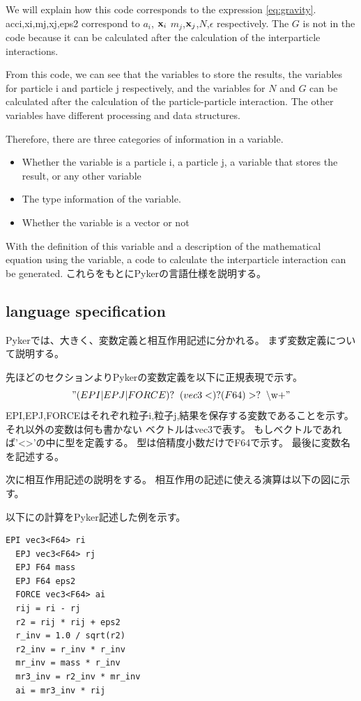 \documentclass[ams, a4j]{U-AizuGT}
\begin{document}
We will explain how this code corresponds to the expression 
\eqref{eq:gravity}.
acci,xi,mj,xj,eps2 correspond to
 $a_i$, $\vb{x}_i$ $m_j$,$\vb{x}_j$,$N$,$\epsilon$ respectively.
The $G$ is not in the code because it can be calculated after the 
calculation of the interparticle interactions.


 From this code, we can see that the variables to store the results, 
the variables for particle i and particle j respectively, and the 
variables for $N$ and $G$ can be calculated after the calculation of 
the particle-particle interaction. The other variables have different 
processing and data structures.


 Therefore, there are three categories of information in a variable.
\begin{itemize}
  \item Whether the variable is a particle i, a particle j, a
  variable that stores the result, or any other variable
  \item The type information of the variable.
  \item Whether the variable is a vector or not
\end{itemize}

 With the definition of this variable and a description of the
mathematical equation using the variable, a code to calculate the
interparticle interaction can be generated.
これらをもとにPykerの言語仕様を説明する。

\subsection{language specification}
Pykerでは、大きく、変数定義と相互作用記述に分かれる。
まず変数定義について説明する。


 先ほどのセクションよりPykerの変数定義を以下に正規表現で示す。
\["(EPI|EPJ|FORCE)?\:\text{ } (vec3<)?(F64)>?\:\text{ } \text{\textbackslash w+}"\]
EPI,EPJ,FORCEはそれぞれ粒子i,粒子j,結果を保存する変数であることを示す。それ以外の変数は何も書かない
ベクトルはvec3で表す。
もしベクトルであれば'<>'の中に型を定義する。
型は倍精度小数だけでF64で示す。
最後に変数名を記述する。


次に相互作用記述の説明をする。
相互作用の記述に使える演算は以下の図に示す。

以下に\label{eq:gravity}の計算をPyker記述した例を示す。
\begin{lstlisting}[frame=single, caption=gravity\_interparticle, label=fuga]
  EPI vec3<F64> ri
  EPJ vec3<F64> rj
  EPJ F64 mass
  EPJ F64 eps2
  FORCE vec3<F64> ai
  rij = ri - rj
  r2 = rij * rij + eps2
  r_inv = 1.0 / sqrt(r2)
  r2_inv = r_inv * r_inv
  mr_inv = mass * r_inv
  mr3_inv = r2_inv * mr_inv
  ai = mr3_inv * rij
\end{lstlisting}
\end{document}
